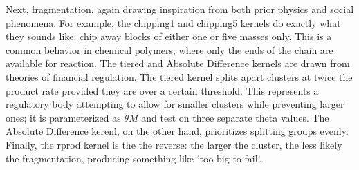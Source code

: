 \documentclass[fleqn,10pt]{wlscirep}
\begin{document}
Next, fragmentation, again drawing inspiration from both prior physics and social phenomena.
For example, the \textcolor{chipping1}{chipping1} and \textcolor{chipping5}{chipping5} kernels do exactly what they sounds like: chip away blocks of either one or five masses only.
This is a common behavior in chemical polymers, where only the ends of the chain are available for reaction.
The tiered and \textcolor{abs}{Absolute Difference } kernels are drawn from theories of financial regulation.
The tiered kernel splits apart clusters at twice the product rate provided they are over a certain threshold.
This represents a regulatory body attempting to allow for smaller clusters while preventing larger ones; it is parameterized as $ \theta M $ and test on three separate theta values.
The \textcolor{abs}{Absolute Difference} kerenl, on the other hand, prioritizes splitting groups evenly.
Finally, the \textcolor{rprod}{rprod} kernel is the the reverse: the larger the cluster, the less likely the fragmentation, producing something like `too big to fail'.
\end{document}
